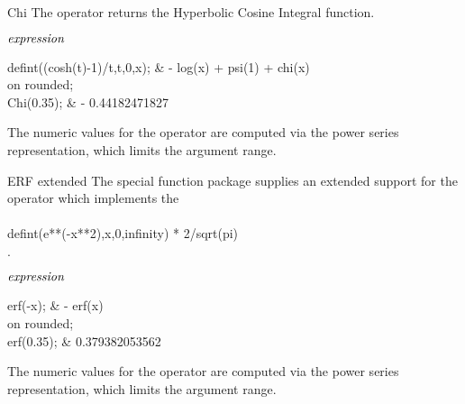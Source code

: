\begin{Operator}{Chi}
The  operator returns the Hyperbolic Cosine Integral function.

\begin{Syntax}
\(\meta{expression}\)
\end{Syntax}

\begin{Examples}
defint((cosh(t)-1)/t,t,0,x);       &   - log(x) + psi(1) + chi(x)\\
on rounded; \\
Chi(0.35);                         &   - 0.44182471827
\end{Examples}

\begin{Comments}
The numeric values for the operator  are computed via the
power series representation, which limits the argument range.
\end{Comments}
\end{Operator}

\begin{Operator}{ERF extended}
The special function package supplies an extended support for the
 operator  which implements the  \\
 \\
  defint(e**(-x**2),x,0,infinity) * 2/sqrt(pi) \\
.\\
\begin{Syntax}
\(\meta{expression}\)
\end{Syntax}

\begin{Examples}
erf(-x);                        &   - erf(x)\\
on rounded; \\
erf(0.35);                      &   0.379382053562
\end{Examples}

\begin{Comments}
The numeric values for the operator  are computed via the
power series representation, which limits the argument range.
\end{Comments}
\end{Operator}

